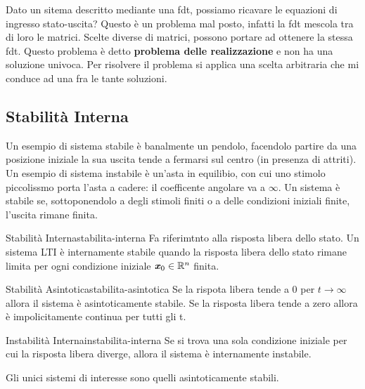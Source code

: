 \documentclass[12pt]{article}
\begin{document}
Dato un sitema descritto mediante una fdt, possiamo ricavare le equazioni di ingresso stato-uscita? Questo \`e un problema mal posto, infatti la fdt mescola tra di loro le matrici. Scelte diverse di matrici, possono portare ad ottenere la stessa fdt. Questo problema \`e detto \textbf{problema delle realizzazione} e non ha una soluzione univoca. Per risolvere il problema si applica una scelta arbitraria che mi conduce ad una fra le tante soluzioni.


\subsection{Stabilit\`a Interna}
Un esempio di sistema stabile \`e banalmente un pendolo, facendolo partire da una posizione iniziale la sua uscita tende a fermarsi sul centro (in presenza di attriti). \\
Un esempio di sistema instabile \`e un'asta in equilibio, con cui uno stimolo piccolissmo porta l'asta a cadere: il coefficente angolare va a $\infty$.
Un sistema \`e stabile se, sottoponendolo a degli stimoli finiti o a delle condizioni iniziali finite, l'uscita rimane finita.

\begin{definition}{Stabilit\`a Interna}{stabilita-interna}
    Fa riferimtnto alla risposta libera dello stato. Un sistema LTI \`e internamente stabile quando la risposta libera dello stato rimane limita per ogni condizione iniziale $\textbf{\textit{x}}_0 \in \mathbb{R}^{n}$ finita.
\end{definition}

\begin{definition}{Stabilit\`a Asintotica}{stabilita-asintotica}
     Se la rispota libera tende a 0 per $t \to \infty$ allora il sistema \`e asintoticamente stabile. Se la risposta libera tende a zero allora \`e impolicitamente continua per tutti gli t.
\end{definition}

\begin{definition}{Instabilit\`a Interna}{instabilita-interna}
    Se si trova una sola condizione iniziale per cui la risposta libera diverge, allora il sistema \`e internamente instabile.
\end{definition}


Gli unici sistemi di interesse sono quelli asintoticamente stabili.
\end{document}

